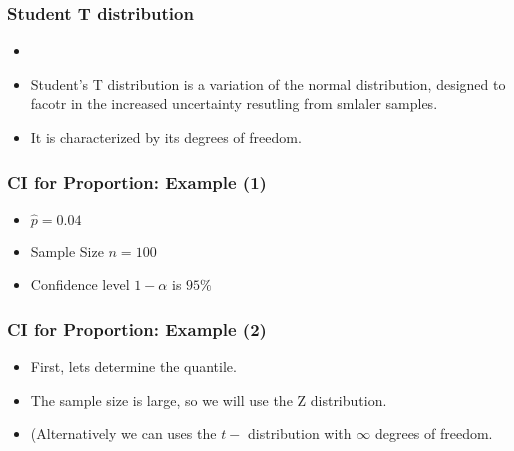 \documentclass[a4]{beamer}
\begin{document}

\begin{frame}\frametitle{Student T distribution}

\begin{itemize}
\item 
\item Student's T distribution is a variation of the normal distribution, designed to facotr in the increased uncertainty resutling from smlaler samples.
\item  It is characterized by its degrees of freedom.
\end{itemize}

\end{frame}

\begin{frame}
\frametitle{CI for Proportion: Example (1)}

\begin{itemize}
\item $\hat{p}  = 0.04$
\item Sample Size $n=100$
\item Confidence level $1-\alpha$ is $95\%$
\end{itemize}

\end{frame}

\begin{frame}\frametitle{CI for Proportion: Example (2)}

\begin{itemize}
\item First, lets determine the quantile.
\item The sample size is large, so we will use the Z distribution.
\item (Alternatively we can uses the $t-$ distribution with $\infty$ degrees of freedom.
\end{itemize}

\end{frame}


\end{document}
